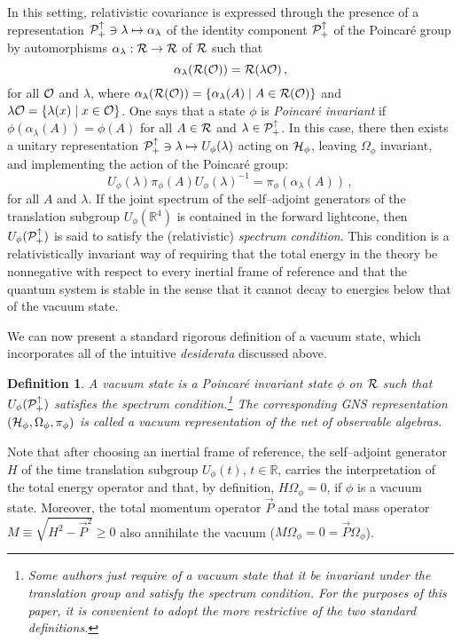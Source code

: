\documentclass[12pt]{article}
\newtheorem{definition}[theorem]{Definition}
\def\nind{\noindent}
\def\Hs{{\cal H}}
\def\Os{{\cal O}}
\def\Ps{{\cal P}}
\def\Rs{{\cal R}}
\def\Pid{{\Ps_+ ^{\uparrow}}}
\def\nind{\noindent}
\def\RR{{\mathbb R}}
\begin{document}
     In this setting, relativistic covariance is expressed through
the presence of a representation 
$\Pid \ni \lambda \mapsto \alpha_\lambda$ of the identity component
$\Pid$ of the Poincar\'e group by automorphisms 
$\alpha_\lambda : \Rs \rightarrow \Rs$ of $\Rs$ such that
%
$$\alpha_\lambda(\Rs(\Os)) = \Rs(\lambda \Os) \, , $$
%
for all $\Os$ and $\lambda$, where 
$\alpha_\lambda(\Rs(\Os)) = \{ \alpha_\lambda(A) \mid A \in \Rs(\Os) \}$
and 
$\lambda \Os = \{ \lambda(x) \mid x \in \Os \}$. One says that
a state $\phi$ is {\it Poincar\'e invariant} if 
$\phi(\alpha_\lambda(A)) = \phi(A)$ for all $A \in \Rs$ and 
$\lambda \in \Pid$. In this case, there then exists a unitary representation
$\Pid \ni \lambda \mapsto U_\phi(\lambda)$ acting on $\Hs_\phi$,
leaving $\Omega_\phi$ invariant, and implementing the action of the 
Poincar\'e group:
%
$$U_\phi(\lambda) \pi_\phi(A) U_\phi(\lambda)^{-1} = 
\pi_\phi(\alpha_\lambda(A)) \, , $$
%
for all $A$ and $\lambda$. If the joint spectrum of the self--adjoint
generators of the translation subgroup $U_\phi(\RR^4)$ is contained in
the forward lightcone, then $U_\phi(\Pid)$ is said to satisfy the
(relativistic) {\it spectrum condition}. This condition is a
relativistically invariant way of requiring that the total energy in
the theory be nonnegative with respect to every inertial frame of
reference and that the quantum system is stable in the sense that it
cannot decay to energies below that of the vacuum state.

     We can now present a standard rigorous definition of a vacuum
state, which incorporates all of the intuitive {\it desiderata} discussed
above.

\begin{definition} \label{vacuum}
A vacuum state is a Poincar\'e invariant state $\phi$ on $\Rs$ such that 
$U_\phi(\Pid)$ satisfies the spectrum condition.\footnote{Some 
authors just require of a vacuum state that it be invariant under
the translation group and satisfy the spectrum condition. For the 
purposes of this paper, it is convenient to adopt the more
restrictive of the two standard definitions.} The corresponding GNS
representation $(\Hs_\phi,\Omega_\phi,\pi_\phi)$ is called a vacuum 
representation of the net of observable algebras.
\end{definition}

\nind  Note that after choosing an inertial frame of reference,
the self--adjoint generator $H$ of the time translation subgroup 
$U_\phi(t)$, $t \in \RR$, carries the interpretation of the total
energy operator and that, by definition, $H \Omega_\phi = 0$,
if $\phi$ is a vacuum state. Moreover, the total momentum operator
$\vec{P}$ and the total mass operator $M \equiv \sqrt{H^2 - \vec{P}^2} \geq 0$ 
also annihilate the vacuum ($M \Omega_\phi = 0 = \vec{P} \Omega_\phi$).
\end{document}
